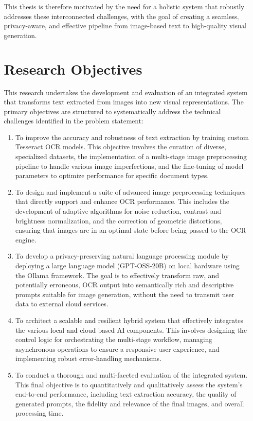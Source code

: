 This thesis is therefore motivated by the need for a holistic system that robustly addresses these interconnected challenges, with the goal of creating a seamless, privacy-aware, and effective pipeline from image-based text to high-quality visual generation.

\section{Research Objectives}
This research undertakes the development and evaluation of an integrated system that transforms text extracted from images into new visual representations. The primary objectives are structured to systematically address the technical challenges identified in the problem statement:

\begin{enumerate}
    \item To improve the accuracy and robustness of text extraction by training custom Tesseract OCR models. This objective involves the curation of diverse, specialized datasets, the implementation of a multi-stage image preprocessing pipeline to handle various image imperfections, and the fine-tuning of model parameters to optimize performance for specific document types.

    \item To design and implement a suite of advanced image preprocessing techniques that directly support and enhance OCR performance. This includes the development of adaptive algorithms for noise reduction, contrast and brightness normalization, and the correction of geometric distortions, ensuring that images are in an optimal state before being passed to the OCR engine.

    \item To develop a privacy-preserving natural language processing module by deploying a large language model (GPT-OSS-20B) on local hardware using the Ollama framework. The goal is to effectively transform raw, and potentially erroneous, OCR output into semantically rich and descriptive prompts suitable for image generation, without the need to transmit user data to external cloud services.

    \item To architect a scalable and resilient hybrid system that effectively integrates the various local and cloud-based AI components. This involves designing the control logic for orchestrating the multi-stage workflow, managing asynchronous operations to ensure a responsive user experience, and implementing robust error-handling mechanisms.

    \item To conduct a thorough and multi-faceted evaluation of the integrated system. This final objective is to quantitatively and qualitatively assess the system's end-to-end performance, including text extraction accuracy, the quality of generated prompts, the fidelity and relevance of the final images, and overall processing time.
\end{enumerate}

